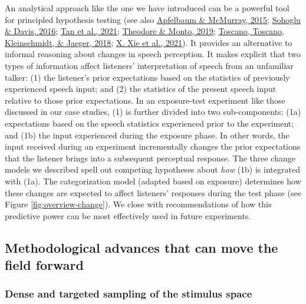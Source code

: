 \documentclass[
  11pt,
  english,
  man,floatsintext]{apa6}
\begin{document}
An analytical approach like the one we have introduced can be a powerful tool for principled hypothesis testing (see also \protect\hyperlink{ref-apfelbaum-mcmurray2015}{Apfelbaum \& McMurray, 2015}; \protect\hyperlink{ref-sohoglu-davis2016}{Sohoglu \& Davis, 2016}; \protect\hyperlink{ref-tan2021}{Tan et al., 2021}; \protect\hyperlink{ref-theodore-monto2019}{Theodore \& Monto, 2019}; \protect\hyperlink{ref-toscano2018}{Toscano, Toscano, Kleinschmidt, \& Jaeger, 2018}; \protect\hyperlink{ref-xie2021cognition}{X. Xie et al., 2021}). It provides an alternative to informal reasoning about changes in speech perception. It makes explicit that two types of information affect listeners' interpretation of speech from an unfamiliar talker: (1) the listener's prior expectations based on the statistics of previously experienced speech input; and (2) the statistics of the present speech input relative to those prior expectations. In an exposure-test experiment like those discussed in our case studies, (1) is further divided into two sub-components: (1a) expectations based on the speech statistics experienced prior to the experiment; and (1b) the input experienced during the exposure phase. In other words, the input received during an experiment incrementally changes the prior expectations that the listener brings into a subsequent perceptual response. The three change models we described spell out competing hypotheses about \emph{how} (1b) is integrated with (1a). The categorization model (adapted based on exposure) determines how these changes are expected to affect listeners' responses during the test phase (see Figure \ref{fig:overview-change}). We close with recommendations of how this predictive power can be most effectively used in future experiments.

\hypertarget{methodological-advances-that-can-move-the-field-forward}{%
\subsection{Methodological advances that can move the field forward}\label{methodological-advances-that-can-move-the-field-forward}}

\hypertarget{dense-and-targeted-sampling-of-the-stimulus-space}{%
\subsubsection{Dense and targeted sampling of the stimulus space}\label{dense-and-targeted-sampling-of-the-stimulus-space}}
\end{document}
